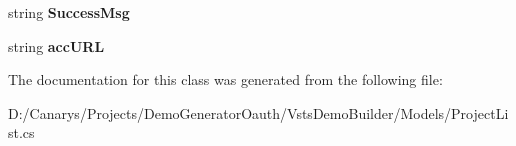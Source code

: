 \begin{DoxyCompactItemize}
string {\bfseries Success\+Msg}
\item 
\mbox{\label{class_vsts_demo_builder_1_1_models_1_1_project_list_1_1_project_count_a3e8ae9c629b12366e5e1286c90ee2cc6}} 
string {\bfseries acc\+U\+RL}
\end{DoxyCompactItemize}


The documentation for this class was generated from the following file\+:\begin{DoxyCompactItemize}
\item 
D\+:/\+Canarys/\+Projects/\+Demo\+Generator\+Oauth/\+Vsts\+Demo\+Builder/\+Models/Project\+List.\+cs\end{DoxyCompactItemize}
